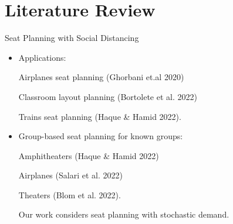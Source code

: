 
\section{Literature Review}
    \frame{\sectionpage}
    \begin{frame}{Seat Planning with Social Distancing}
      \begin{itemize}
        \item Applications: 

        \vspace*{0.2cm}
        {\color{red} Airplanes} seat planning (Ghorbani et.al 2020)
        
        {\color{red} Classroom} layout planning (Bortolete et al. 2022)
        
        {\color{red} Trains} seat planning (Haque \& Hamid 2022).
        
        \vspace*{0.2cm}

        \item Group-based seat planning for {\color{green}known groups}:
        
        
        \vspace*{0.2cm} 

         {\color{red}Amphitheaters} (Haque \& Hamid 2022) 
         
         {\color{red}Airplanes} (Salari et al. 2022) 
         
         {\color{red}Theaters} (Blom et al. 2022).
        
         \vspace*{0.4cm}
        Our work considers seat planning with stochastic demand.
        
      \end{itemize}
      \end{frame}
      
